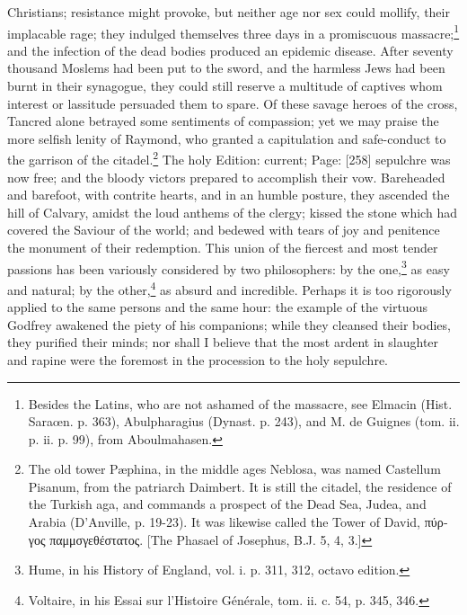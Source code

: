 Christians; resistance might provoke, but neither age nor sex could mollify, their implacable rage; they indulged themselves three days in a promiscuous massacre;\footnote{Besides the Latins, who are not ashamed of the massacre, see Elmacin (Hist. Saraœn. p. 363), Abulpharagius (Dynast. p. 243), and M. de Guignes (tom. ii. p. ii. p. 99), from Aboulmahasen.} and the infection of the dead bodies produced an epidemic disease. After seventy thousand Moslems had been put to the sword, and the harmless Jews had been burnt in their synagogue, they could still reserve a multitude of captives whom interest or lassitude persuaded them to spare. Of these savage heroes of the cross, Tancred alone betrayed some sentiments of compassion; yet we may praise the more selfish lenity of Raymond, who granted a capitulation and safe-conduct to the garrison of the citadel.\footnote{The old tower Pæphina, in the middle ages Neblosa, was named Castellum Pisanum, from the patriarch Daimbert. It is still the citadel, the residence of the Turkish aga, and commands a prospect of the Dead Sea, Judea, and Arabia (D\texthebrew{}’Anville, p. 19-23). It was likewise called the Tower of David, \textgreek{πύργος παμμσγεθέστατος}. [The Phasael of Josephus, B.J. 5, 4, 3.]} The holy Edition: current; Page: [258] sepulchre was now free; and the bloody victors prepared to accomplish their vow. Bareheaded and barefoot, with contrite hearts, and in an humble posture, they ascended the hill of Calvary, amidst the loud anthems of the clergy; kissed the stone which had covered the Saviour of the world; and bedewed with tears of joy and penitence the monument of their redemption. This union of the fiercest and most tender passions has been variously considered by two philosophers: by the one,\footnote{Hume, in his History of England, vol. i. p. 311, 312, octavo edition.} as easy and natural; by the other,\footnote{Voltaire, in his Essai sur l\texthebrew{}’Histoire Générale, tom. ii. c. 54, p. 345, 346.} as absurd and incredible. Perhaps it is too rigorously applied to the same persons and the same hour: the example of the virtuous Godfrey awakened the piety of his companions; while they cleansed their bodies, they purified their minds; nor shall I believe that the most ardent in slaughter and rapine were the foremost in the procession to the holy sepulchre.

